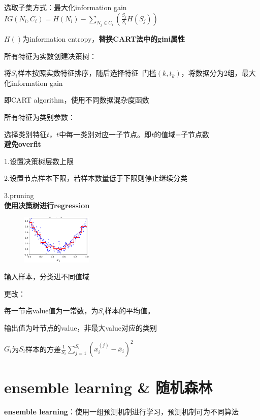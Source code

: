 \documentclass[UTF8]{ctexart}
\begin{document}
  选取子集方式：最大化information gain $IG(N_i, C_i) = H(N_i) - \sum_{N_j \in C_i}(\frac{S_j}{S_i}H(S_j))$
  
  \quad $H()$为information entropy，\textbf{替换CART法中的gini属性}
  
  所有特征为实数创建决策树：
  
  \quad 将$S_i$样本按照实数特征排序，随后选择特征\ 门槛$(k, t_k)$，将数据分为2组，最大化information gain

  \quad 即CART algorithm，使用不同数据混杂度函数
  
  所有特征为类别参数：
  
  \quad 选择类别特征$t$，$t$中每一类别对应一子节点。即$t$的值域=子节点数\\
\textbf{避免overfit}

  1.设置决策树层数上限

  2.设置节点样本下限，若样本数量低于下限则停止继续分类
  
  3.pruning\\
\textbf{使用决策树进行regression}

  \begin{figure}[H] %
    \centering %
    \includegraphics[width=0.3\textwidth]{note_images/deci_tree_regression.png} %
  \end{figure}

  输入样本，分类进不同值域

  更改：
  
  \quad 每一节点value值为一常数，为$S_i$样本的平均值。
  
  \quad 输出值为叶节点的value，非最大value对应的类别

  \quad $G_i$为$S_i$样本的方差$\frac{1}{S_i}\sum_{j=1}^{S_i}(x_i^{(j)} - \bar{x}_i)^2$

\section{ensemble learning \& 随机森林}
\noindent \textbf{ensemble learning}：使用一组预测机制进行学习，预测机制可为不同算法
\end{document}
